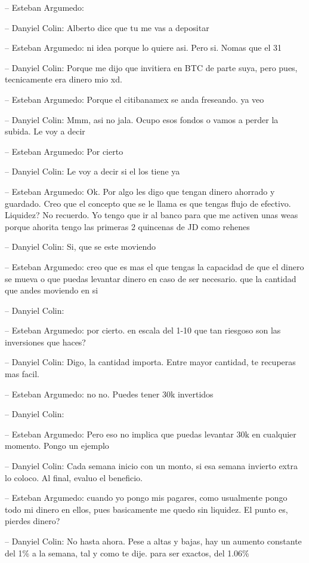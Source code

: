 -- Esteban Argumedo:

-- Danyiel Colin: Alberto dice que tu me vas a depositar

-- Esteban Argumedo: ni idea porque lo quiere asi. Pero si. Nomas que el
31

-- Danyiel Colin: Porque me dijo que invitiera en BTC de parte suya,
pero pues, tecnicamente era dinero mio xd.

-- Esteban Argumedo: Porque el citibanamex se anda freseando. ya veo

-- Danyiel Colin: Mmm, asi no jala. Ocupo esos fondos o vamos a perder
la subida. Le voy a decir

-- Esteban Argumedo: Por cierto

-- Danyiel Colin: Le voy a decir si el los tiene ya

-- Esteban Argumedo: Ok. Por algo les digo que tengan dinero ahorrado y
guardado. Creo que el concepto que se le llama es que tengas flujo de
efectivo. Liquidez? No recuerdo. Yo tengo que ir al banco para que me
activen unas weas porque ahorita tengo las primeras 2 quincenas de JD
como rehenes

-- Danyiel Colin: Si, que se este moviendo

-- Esteban Argumedo: creo que es mas el que tengas la capacidad de que
el dinero se mueva o que puedas levantar dinero en caso de ser
necesario. que la cantidad que andes moviendo en si

-- Danyiel Colin:

-- Esteban Argumedo: por cierto. en escala del 1-10 que tan riesgoso son
las inversiones que haces?

-- Danyiel Colin: Digo, la cantidad importa. Entre mayor cantidad, te
recuperas mas facil.

-- Esteban Argumedo: no no. Puedes tener 30k invertidos

-- Danyiel Colin:

-- Esteban Argumedo: Pero eso no implica que puedas levantar 30k en
cualquier momento. Pongo un ejemplo

-- Danyiel Colin: Cada semana inicio con un monto, si esa semana
invierto extra lo coloco. Al final, evaluo el beneficio.

-- Esteban Argumedo: cuando yo pongo mis pagares, como usualmente pongo
todo mi dinero en ellos, pues basicamente me quedo sin liquidez. El
punto es, pierdes dinero?

-- Danyiel Colin: No hasta ahora. Pese a altas y bajas, hay un aumento
constante del 1\% a la semana, tal y como te dije. para ser exactos, del
1.06\%


